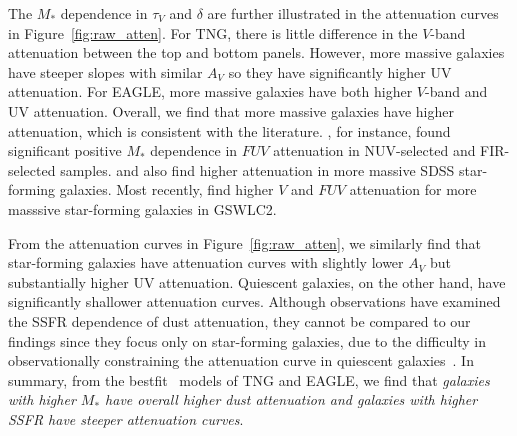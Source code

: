 The $M_*$ dependence in $\tau_V$ and $\delta$
are further illustrated in the attenuation curves in Figure~\ref{fig:raw_atten}.
For TNG, there is little difference in the $V$-band attenuation between the 
top and bottom panels. However, more massive galaxies have steeper slopes 
with similar $A_V$ so they have significantly higher UV attenuation. For
EAGLE, more massive galaxies have both higher $V$-band and UV attenuation.
Overall, we find that more massive galaxies have higher attenuation,
which is consistent with the literature. \cite{burgarella2005}, for instance,
found significant positive $M_*$ dependence in $FUV$ attenuation in
NUV-selected and FIR-selected samples. \cite{garn2010} and \cite{battisti2016}
also find higher attenuation in more massive SDSS star-forming galaxies. Most
recently, \cite{salim2018} find higher $V$ and $FUV$ attenuation for more
masssive star-forming galaxies in GSWLC2. 

From the attenuation curves in
Figure~\ref{fig:raw_atten}, we similarly find that star-forming galaxies have
attenuation curves with slightly lower $A_V$ but substantially higher UV 
attenuation. Quiescent galaxies, on the other hand, have significantly 
shallower attenuation curves. Although observations have examined the
SSFR dependence of dust attenuation, they cannot be compared to our findings since
they focus only on star-forming galaxies, due to the difficulty in
observationally constraining the attenuation curve in quiescent
galaxies~\citep[\eg][]{garn2010, reddy2015, battisti2016, battisti2017, salim2018}. 
In summary, from the bestfit \eda~models of TNG and EAGLE, we find that
\emph{galaxies with higher $M_*$ have overall higher dust attenuation and
galaxies with higher SSFR have steeper attenuation curves}.
